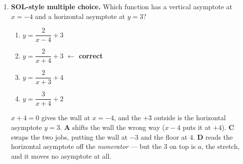 \documentclass[10pt]{article}
\begin{document}
\begin{enumerate}[leftmargin=1.8em, itemsep=7pt]
\begin{center}
\begin{minipage}{0.55\linewidth}
        \vspace{3pt}
        Substitute $(3,2)$ and solve for $a$:


        $a=$  \quad Equation: 

        \vspace{3pt}
        Check on $(5,0)$: 
        \end{minipage}
        \end{center}

  \item \textbf{SOL-style multiple choice.} Which function has a vertical asymptote at $x=-4$ and a
        horizontal asymptote at $y=3$?
        \begin{enumerate}[label=\Alph*., leftmargin=1.9em, itemsep=1pt]
          \item $y=\dfrac{2}{x-4}+3$
          \item $y=\dfrac{2}{x+4}+3$
                \quad \textcolor{keyred}{\textbf{$\leftarrow$ correct}}
          \item $y=\dfrac{2}{x+3}+4$
          \item $y=\dfrac{3}{x+4}+2$
        \end{enumerate}
        \vspace{2pt}
        {\small $x+4=0$ gives the wall at $x=-4$, and the $+3$ outside is the horizontal asymptote
        $y=3$. \textbf{A} shifts the wall the wrong way ($x-4$ puts it at $+4$). \textbf{C} swaps the
        two jobs, putting the wall at $-3$ and the floor at $4$. \textbf{D} reads the horizontal
        asymptote off the \emph{numerator} --- but the $3$ on top is $a$, the stretch, and it moves no
        asymptote at all.}
\end{enumerate}
\end{document}
